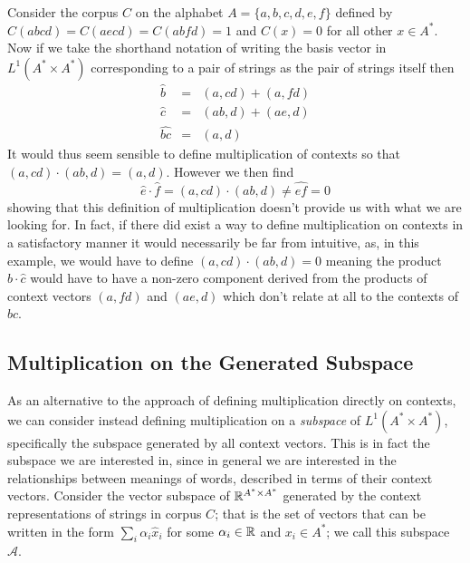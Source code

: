 \documentclass[11pt]{report}
\begin{document}
Consider the corpus $C$ on the alphabet $A = \{a,b,c,d,e,f\}$ defined by $C(abcd) = C(aecd) = C(abfd) = 1$ and $C(x) = 0$ for all other $x \in A^*$. Now if we take the shorthand notation of writing the basis vector in $L^1(A^*\times A^*)$ corresponding to a pair of strings as the pair of strings itself then
\begin{eqnarray*}
\hat{b} &=& (a,cd) + (a,fd)\\
\hat{c} &=& (ab,d) + (ae,d)\\
\widehat{bc} &=& (a,d)
\end{eqnarray*}
%
%
It would thus seem sensible to define multiplication of contexts so that $(a,cd)\cdot (ab,d) = (a,d)$. However we then find
$$\hat{e}\cdot \hat{f} = (a,cd)\cdot (ab,d) \neq \widehat{ef} = 0$$
showing that this definition of multiplication doesn't provide us with what we are looking for. In fact, if there did exist a way to define multiplication on contexts in a satisfactory manner it would necessarily be far from intuitive, as, in this example, we would have to define $(a,cd)\cdot (ab,d) = 0$ meaning the product $\hat{b}\cdot\hat{c}$ would have to have a non-zero component derived from the products of context vectors $(a,fd)$ and $(ae,d)$ which don't relate at all to the contexts of $bc$.


\subsection{Multiplication on the Generated Subspace}

As an alternative to the approach of defining multiplication directly on contexts, we can consider instead defining multiplication on a \emph{subspace} of $L^1(A^*\times A^*)$, specifically the subspace generated by all context vectors. This is in fact the subspace we are interested in, since in general we are interested in the relationships between meanings of words, described in terms of their context vectors. Consider the vector subspace of $\mathbb{R}^{A^* \times A^*}$ generated by the context representations of strings in corpus $C$; that is the set of vectors that can be written in the form $\sum_i \alpha_i \hat{x}_i$ for some $\alpha_i \in \mathbb{R}$  and $x_i \in A^*$; we call this subspace $\mathcal{A}$.
\end{document}
